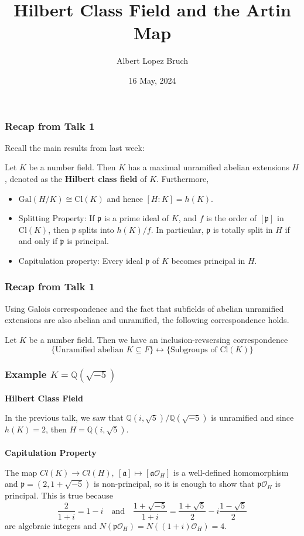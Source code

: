 \documentclass{beamer}
\title{Hilbert Class Field and the Artin Map}
\author{Albert Lopez Bruch}
\date{16 May, 2024}
\newcommand{\Gal}{\mathrm{Gal}}
\newcommand{\Cl}{\mathrm{Cl}}
\newcommand{\QQ}{\mathbb{Q}}
\newcommand{\pp}{\mathfrak{p}}
\newcommand{\af}{\mathfrak{a}}
\theoremstyle{plain}
\begin{document}
\frame{\titlepage}


\begin{frame}
    \frametitle{Recap from Talk 1}
    Recall the main results from last week:
    \begin{theorem}
        Let $K$ be a number field. Then $K$ has a maximal unramified abelian extensions $H$, denoted as the \textbf{Hilbert class field} of $K$. \pause 
        Furthermore,
        \begin{itemize}
            \item $\Gal(H/K)\cong\Cl(K)$ and hence $[H:K]=h(K)$.\pause
            \item Splitting Property: If $\pp$ is a prime ideal of $K$, and $f$ is the order of $[\pp]$ in $\Cl(K)$, then $\pp$ splits into $h(K)/f$. In particular, $\pp$ is totally split in $H$ if and only if $\pp$ is principal.\pause
            \item Capitulation property: Every ideal $\pp$ of $K$ becomes principal in $H$. 
        \end{itemize}
    \end{theorem}
\end{frame}

\begin{frame}
    \frametitle{Recap from Talk 1}
    Using Galois correspondence and the fact that subfields of abelian unramified extensions are also abelian and unramified, the following correspondence holds.

    \begin{corollary}
        Let $K$ be a number field. Then we have an inclusion-revsersing correspondence
        \[
            \{\textrm{Unramified abelian }K\subseteq F\}\longleftrightarrow \{\textrm{Subgroups of }\Cl(K)\}    
        \]
    \end{corollary}
\end{frame}



\begin{frame}
    \frametitle{Example $K=\QQ(\sqrt{-5})$}
    \textbf{Hilbert Class Field} 

    In the previous talk, we saw that $\QQ(i,\sqrt{5})/\QQ(\sqrt{-5})$ is unramified and since $h(K)=2$, then $H=\QQ(i,\sqrt{5})$. 
    \pause
    \\~\\
    \textbf{Capitulation Property} 

    The map $Cl(K)\rightarrow Cl(H),\ [\af]\mapsto[\af\mathcal{O}_H]$ is a well-defined homomorphism and $\pp=(2,1+\sqrt{-5})$ is non-principal, so it is enough to show that $\pp\mathcal{O}_H$ is principal.\pause 
    This is true because 
    $$\frac{2}{1+i}=1-i\quad\text{and}\quad\frac{1+\sqrt{-5}}{1+i}=\frac{1+\sqrt{5}}{2}-i\frac{1-\sqrt{5}}{2}$$
    are algebraic integers and $N(\pp\mathcal{O}_H)=N((1+i)\mathcal{O}_H)=4$.
\end{frame}
\end{document}

